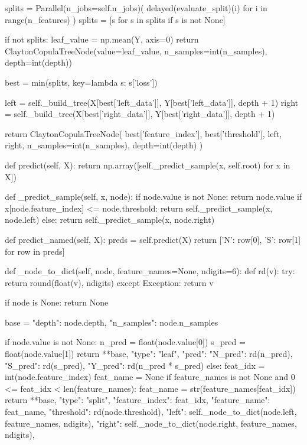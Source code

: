         splits = Parallel(n_jobs=self.n_jobs)(
            delayed(evaluate_split)(i) for i in range(n_features)
        )
        splits = [s for s in splits if s is not None]

        if not splits:
            leaf_value = np.mean(Y, axis=0)
            return ClaytonCopulaTreeNode(value=leaf_value, n_samples=int(n_samples), depth=int(depth))

        best = min(splits, key=lambda s: s['loss'])

        left = self._build_tree(X[best['left_data']], Y[best['left_data']], depth + 1)
        right = self._build_tree(X[best['right_data']], Y[best['right_data']], depth + 1)

        return ClaytonCopulaTreeNode(
            best['feature_index'], best['threshold'], left, right,
            n_samples=int(n_samples), depth=int(depth)
        )

    def predict(self, X):
        return np.array([self._predict_sample(x, self.root) for x in X])

    def _predict_sample(self, x, node):
        if node.value is not None:
            return node.value
        if x[node.feature_index] <= node.threshold:
            return self._predict_sample(x, node.left)
        else:
            return self._predict_sample(x, node.right)

    def predict_named(self, X):
        preds = self.predict(X)
        return [{'N': row[0], 'S': row[1]} for row in preds]

    def _node_to_dict(self, node, feature_names=None, ndigits=6):
        def rd(v):
            try:
                return round(float(v), ndigits)
            except Exception:
                return v

        if node is None:
            return None

        base = {"depth": node.depth, "n_samples": node.n_samples}

        if node.value is not None:
            n_pred = float(node.value[0])
            s_pred = float(node.value[1])
            return {
                **base,
                "type": "leaf",
                "pred": {
                    "N_pred": rd(n_pred),
                    "S_pred": rd(s_pred),
                    "Y_pred": rd(n_pred * s_pred)
                }
            }
        else:
            feat_idx = int(node.feature_index)
            feat_name = None
            if feature_names is not None and 0 <= feat_idx < len(feature_names):
                feat_name = str(feature_names[feat_idx])
            return {
                **base,
                "type": "split",
                "feature_index": feat_idx,
                "feature_name": feat_name,
                "threshold": rd(node.threshold),
                "left": self._node_to_dict(node.left, feature_names, ndigits),
                "right": self._node_to_dict(node.right, feature_names, ndigits),
            }

